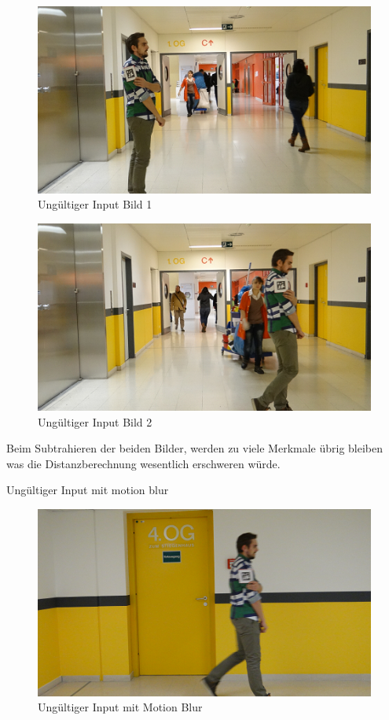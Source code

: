\documentclass[deutsch]{scrartcl}
\begin{document}
\begin{figure}[H]
	\centering
	\includegraphics{ungueltig1.png}
	\caption{Ungültiger Input Bild 1}
	\label{fig3}
\end{figure}
\begin{figure}[H]
	\centering
	\includegraphics{ungueltig2.png}
	\caption{Ungültiger Input Bild 2}
	\label{fig4}
\end{figure}

Beim Subtrahieren der beiden Bilder, werden zu viele Merkmale übrig bleiben was die Distanzberechnung wesentlich erschweren würde.

Ungültiger Input mit motion blur

\begin{figure}[H]
	\centering
	\includegraphics{ungueltig3.png}
	\caption{Ungültiger Input mit Motion Blur}
	\label{fig5}
\end{figure}
\end{document}
